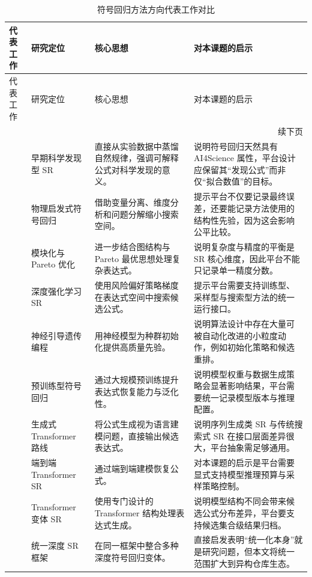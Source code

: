 \documentclass[UTF8,12pt]{ctexart}
\begin{document}
\small
\begin{longtable}{p{2.8cm}p{3.0cm}p{4.7cm}p{4.7cm}}
\caption{符号回归方法方向代表工作对比}\label{tab:related-sr-methods}\\
\toprule
代表工作 & 研究定位 & 核心思想 & 对本课题的启示 \\
\midrule
\endfirsthead
\toprule
代表工作 & 研究定位 & 核心思想 & 对本课题的启示 \\
\midrule
\endhead
\midrule
\multicolumn{4}{r}{续下页}\\
\endfoot
\bottomrule
\endlastfoot
\citet{schmidt2009distilling} & 早期科学发现型 SR & 直接从实验数据中蒸馏自然规律，强调可解释公式对科学发现的意义。 & 说明符号回归天然具有 AI4Science 属性，平台设计应保留其“发现公式”而非仅“拟合数值”的目标。 \\
\citet{udrescu2020aifeynman} & 物理启发式符号回归 & 借助变量分离、维度分析和问题分解缩小搜索空间。 & 提示平台不仅要记录最终误差，还要能记录方法使用的结构性先验，因为这会影响公平比较。 \\
\citet{udrescu2020aifeynman2} & 模块化与 Pareto 优化 & 进一步结合图结构与 Pareto 最优思想处理复杂表达式。 & 说明复杂度与精度的平衡是 SR 核心维度，因此平台不能只记录单一精度分数。 \\
\citet{petersen2021deep} & 深度强化学习 SR & 使用风险偏好策略梯度在表达式空间中搜索候选公式。 & 提示平台需要支持训练型、采样型与搜索型方法的统一运行接口。 \\
\citet{mundhenk2021seeding} & 神经引导遗传编程 & 用神经模型为种群初始化提供高质量先验。 & 说明算法设计中存在大量可被自动化改进的小粒度动作，例如初始化策略和候选重排。 \\
\citet{biggio2021nsr} & 预训练型符号回归 & 通过大规模预训练提升表达式恢复能力与泛化性。 & 说明模型权重与数据生成策略会显著影响结果，平台需要统一记录模型版本与推理配置。 \\
\citet{valipour2021symbolicgpt} & 生成式 Transformer 路线 & 将公式生成视为语言建模问题，直接输出候选表达式。 & 说明序列生成类 SR 与传统搜索式 SR 在接口层面差异很大，平台抽象需足够通用。 \\
\citet{kamienny2022end} & 端到端 Transformer SR & 通过端到端建模恢复公式。 & 对本课题的启示是平台需要显式支持模型推理预算与采样策略控制。 \\
\citet{vastl2022symformer} & Transformer 变体 SR & 使用专门设计的 Transformer 结构处理表达式生成。 & 说明模型结构不同会带来候选公式分布差异，平台要支持候选集合级结果归档。 \\
\citet{landajuela2022udsr} & 统一深度 SR 框架 & 在同一框架中整合多种深度符号回归变体。 & 直接启发表明“统一化本身”就是研究问题，但本文将统一范围扩大到异构仓库生态。 \\

\end{longtable}
\end{document}
